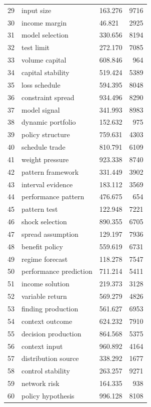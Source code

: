 \documentclass[11pt]{report}
\begin{document}
\begin{longtable}{rllr}
29 & input size & 163.276 & 9716 \\
30 & income margin & 46.821 & 2925 \\
31 & model selection & 330.656 & 8194 \\
32 & test limit & 272.170 & 7085 \\
33 & volume capital & 608.846 & 964 \\
34 & capital stability & 519.424 & 5389 \\
35 & loss schedule & 594.395 & 8048 \\
36 & constraint spread & 934.496 & 8290 \\
37 & model signal & 341.993 & 8983 \\
38 & dynamic portfolio & 152.632 & 975 \\
39 & policy structure & 759.631 & 4303 \\
40 & schedule trade & 810.791 & 6109 \\
41 & weight pressure & 923.338 & 8740 \\
42 & pattern framework & 331.449 & 3902 \\
43 & interval evidence & 183.112 & 3569 \\
44 & performance pattern & 476.675 & 654 \\
45 & pattern test & 122.948 & 7221 \\
46 & shock selection & 890.355 & 6705 \\
47 & spread assumption & 129.197 & 7936 \\
48 & benefit policy & 559.619 & 6731 \\
49 & regime forecast & 118.278 & 7547 \\
50 & performance prediction & 711.214 & 5411 \\
51 & income solution & 219.373 & 3128 \\
52 & variable return & 569.279 & 4826 \\
53 & finding production & 561.627 & 6953 \\
54 & context outcome & 624.232 & 7910 \\
55 & decision production & 864.568 & 5375 \\
56 & context input & 960.892 & 4164 \\
57 & distribution source & 338.292 & 1677 \\
58 & control stability & 263.257 & 9271 \\
59 & network risk & 164.335 & 938 \\
60 & policy hypothesis & 996.128 & 8108 \\
\end{longtable}
\end{document}
